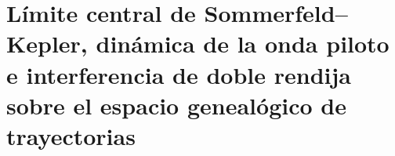 \chapter{Límite central de Sommerfeld--Kepler, dinámica de la onda piloto e interferencia de doble rendija sobre el espacio genealógico de trayectorias}
\label{chap:md-sommerfeld-piloto-rendija}
\begingroup
\let\HMTOwnerSection\section
\let\HMTOwnerSubsection\subsection
\let\HMTOwnerSubsubsection\subsubsection
\let\HMTOwnerParagraph\paragraph
\let\chapter\HMTOwnerSection
\let\section\HMTOwnerSubsection
\let\subsection\HMTOwnerSubsubsection
\let\subsubsection\HMTOwnerParagraph

\endgroup
\begingroup
\let\HMTOwnerSection\section
\let\HMTOwnerSubsection\subsection
\let\HMTOwnerSubsubsection\subsubsection

